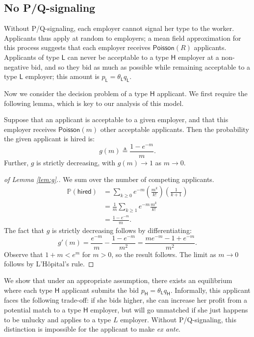 \documentclass[prodmode,acmec]{ec-acmsmall}
\renewcommand{\H}{\ensuremath{\mathsf{H}}}
\renewcommand{\L}{\ensuremath{\mathsf{L}}}
\newcommand{\poiss}{\ensuremath{\mathsf{Poisson}}}
\newcommand{\hottowel}{P/Q-signaling}
\begin{document}
\subsection{No \hottowel}

Without \hottowel, each employer cannot signal her type to the worker.
Applicants thus apply at random to employers;
a mean field approximation for this process suggests that each employer receives $\poiss(R)$ applicants.
Applicants of type $\L$ can never be acceptable to a type $\H$ employer at a non-negative bid, and so they bid as much as possible while remaining acceptable to a type $\L$ employer;
this amount is $p_\L = \theta_\L q_\L$.

Now we consider the decision problem of a type $\H$ applicant.  We first require the following lemma, which is key to our analysis of this model.

\begin{lemma}
\label{lem:g}
Suppose that an applicant is acceptable to a given employer, and that this employer receives $\poiss(m)$ other acceptable applicants.
Then the probability the given applicant is hired is:
\[ g(m) \triangleq \frac{1 - e^{-m}}{m}. \]
Further, $g$ is strictly decreasing, with $g(m) \to 1$ as $m \to 0$.
\end{lemma}

\begin{proof}[of Lemma \ref{lem:g}.]
We sum over the number of competing applicants.
\begin{align*}
\mathbb{P}(\textsf{hired}) &= \sum_{k \geq 0} e^{-m} \left( \frac{m^k}{k!} \right) \left( \frac{1}{k+1}\right) \\
& = \frac{1}{m} \sum_{k \geq 1} e^{-m} \frac{m^k}{k!} \\
& = \frac{1 - e^{-m}}{m}.
\end{align*}
The fact that $g$ is strictly decreasing follows by differentiating:
\[ g'(m) = \frac{e^{-m}}{m} - \frac{1 - e^{-m}}{m^2} = \frac{m e^{-m} - 1 + e^{-m}}{m^2}. \]
Observe that $1 + m < e^m$ for $m > 0$, so the result follows.
The limit as $m \to 0$ follows by L'H\^{o}pital's rule.
\end{proof}

We show that under an appropriate assumption, there exists an equilibrium where each type $\H$ applicant submits the bid $p_\H = \theta_\L q_\H$.
Informally, this applicant faces the following trade-off:
if she bids higher, she can increase her profit from a potential match to a type $\H$ employer, but will go unmatched if she just happens to be unlucky and applies to a type $L$ employer.
Without \hottowel, this distinction is impossible for the applicant to make {\em ex ante}.
\end{document}
